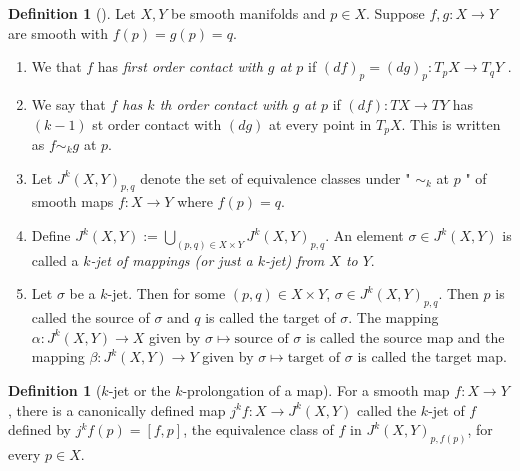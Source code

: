 \documentclass[reqno]{amsart}
\theoremstyle{definition}
\newtheorem{definition}[theorem]{Definition}
\theoremstyle{remark}
\begin{document}
\begin{definition}[]
   Let $X,Y$ be smooth manifolds and $p \in X$. 
   Suppose $f,g \colon X \to Y$ are smooth
   with $f(p) = g(p) = q$.
   \begin{enumerate}
       \item We that $f$ has \textit{first order contact
           with $g$ at $p$ } if $\left( df \right)_p
           = \left( dg \right)_p \colon
           T_p X \to T_q Y$ .
       \item We say that \textit{$f$ has $k$ th order
           contact with $g$ at $p$} if
           $\left( df \right) \colon
           TX \to TY$ has $\left( k-1 \right) $ st
           order contact with $\left( dg \right) $ at
           every point in $T_p X$. This is written
           as $f \sim_k g$ at $p$.
       \item Let $J^{k}(X,Y)_{p,q}$ denote the
           set of equivalence classes under
           " $\sim_k$ at $p$ " of smooth maps
           $f \colon X \to Y$ where
           $f(p) = q$.
       \item Define $J^{k}(X,Y) :=
           \bigcup_{\left( p,q \right) \in X \times Y} 
           J^{k}(X,Y)_{p,q}$. An element
           $\sigma \in J^{k}(X,Y)$ is called a 
           \textit{$k$-jet of mappings (or just a $k$-jet)
           from $X$ to $Y$}.
       \item Let $\sigma$ be a $k$-jet. Then
           for some $\left( p,q \right) \in X \times Y$,
           $\sigma \in J^{k}(X,Y)_{p,q}$. Then
           $p$ is called the source of $\sigma$ and
           $q$ is called the target of $\sigma$. The
           mapping $\alpha \colon J^{k}(X,Y) \to X$ 
           given by $\sigma \mapsto \text{source of } \sigma$ 
           is called the source map and the mapping
           $\beta \colon J^{k}(X,Y) \to Y$ given by
           $\sigma \mapsto \text{target of }\sigma$ is called
           the target map.
   \end{enumerate}
\end{definition}

\begin{definition}[$k$-jet or the $k$-prolongation of a map]
    For a smooth map
    $f \colon X \to Y$, there is a canonically defined map
    $j^{k}f \colon X \to J^{k}(X,Y)$ called the
    $k$-jet of $f$ defined by
    $j^{k}f(p) = \left[ f, p \right] $, the
    equivalence class of $f$ in
    $J^{k}(X,Y)_{p, f(p)}$, for every
    $p \in X$.
\end{definition}
\end{document}

